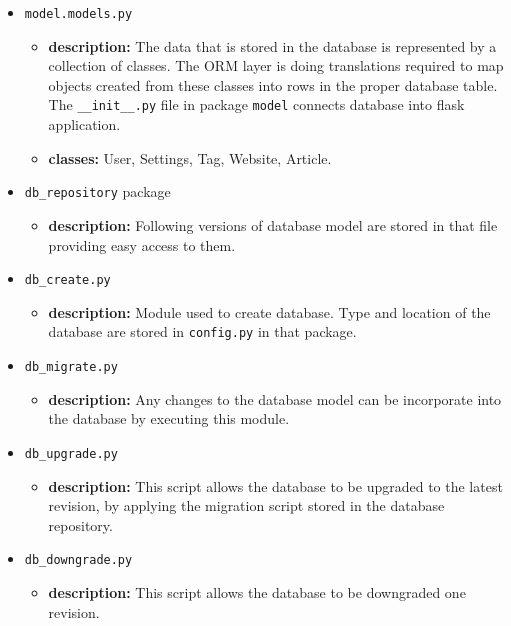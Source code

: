 \documentclass[12pt]{article}
\begin{document}
\begin{itemize}
	\item \texttt{model.models.py}
	\begin{itemize}
		\item \textbf{description:} The data that is stored in the database is represented by a collection of classes. The ORM layer is doing translations required to map objects created from these classes into rows in the proper database table. The \texttt{\_\_init\_\_.py} file in package \texttt{model} connects database into flask application.
		
		\item \textbf{classes:} User, Settings, Tag, Website, Article.
	\end{itemize}
		
	\item \texttt{db\_repository} package 
	\begin{itemize}
		\item \textbf{description:} Following versions of database model are stored in that file providing easy access to them.
	\end{itemize}
	
	\item \texttt{db\_create.py}
	\begin{itemize}
		\item \textbf{description:} Module used to create database. Type and location of the database are stored in \texttt{config.py} in that package.
	\end{itemize}
	
	\item \texttt{db\_migrate.py}
	\begin{itemize}
		\item \textbf{description:} Any changes to the database model can be incorporate into the database by executing this module. 
	\end{itemize}
	
	\item \texttt{db\_upgrade.py}
	\begin{itemize}
		\item \textbf{description:} This script allows the database to be upgraded to the latest revision, by applying the migration script stored in the database repository.
	\end{itemize}
		
	\item \texttt{db\_downgrade.py}
	\begin{itemize}
		\item \textbf{description:} This script allows the database to be downgraded one revision.
	\end{itemize}
		

\end{itemize}
\end{document}
